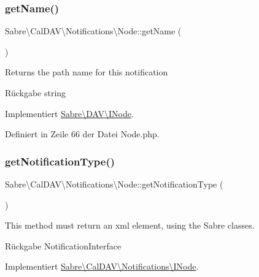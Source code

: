 \subsubsection{\texorpdfstring{get\+Name()}{getName()}}
{\footnotesize\ttfamily Sabre\textbackslash{}\+Cal\+D\+A\+V\textbackslash{}\+Notifications\textbackslash{}\+Node\+::get\+Name (\begin{DoxyParamCaption}{ }\end{DoxyParamCaption})}

Returns the path name for this notification

\begin{DoxyReturn}{Rückgabe}
string 
\end{DoxyReturn}


Implementiert \mbox{\hyperlink{interface_sabre_1_1_d_a_v_1_1_i_node_ab616fe836b1ae36af12126a2bc934dce}{Sabre\textbackslash{}\+D\+A\+V\textbackslash{}\+I\+Node}}.



Definiert in Zeile 66 der Datei Node.\+php.

\mbox{\label{class_sabre_1_1_cal_d_a_v_1_1_notifications_1_1_node_ac2b3cb401257a3a7b3ab48645d9606b3}} 
\subsubsection{\texorpdfstring{get\+Notification\+Type()}{getNotificationType()}}
{\footnotesize\ttfamily Sabre\textbackslash{}\+Cal\+D\+A\+V\textbackslash{}\+Notifications\textbackslash{}\+Node\+::get\+Notification\+Type (\begin{DoxyParamCaption}{ }\end{DoxyParamCaption})}

This method must return an xml element, using the Sabre classes.

\begin{DoxyReturn}{Rückgabe}
Notification\+Interface 
\end{DoxyReturn}


Implementiert \mbox{\hyperlink{interface_sabre_1_1_cal_d_a_v_1_1_notifications_1_1_i_node_a0d1bdc2aa548290053019ed0f30c7dcf}{Sabre\textbackslash{}\+Cal\+D\+A\+V\textbackslash{}\+Notifications\textbackslash{}\+I\+Node}}.



